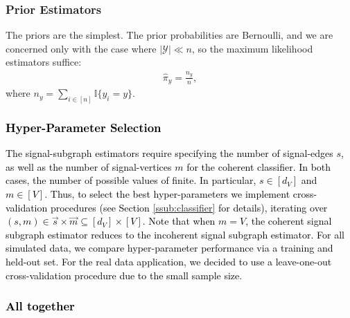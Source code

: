 \documentclass[10pt,journal,cspaper,compsoc]{IEEEtran}
\providecommand{\tk}[1]{\textcolor{black}{#1}}
\newcommand{\II}{\mathbb{I}}           %
\providecommand{\mc}[1]{\mathcal{#1}}
\providecommand{\mv}[1]{\vec{#1}}
\providecommand{\wh}[1]{\widehat{#1}}
\begin{document}



\subsubsection{Prior Estimators} %
\label{sub:prior_estimators}

The priors are the simplest.  The prior probabilities are Bernoulli, and we are concerned only with the case where $|\mc{Y}| \ll n$, so the maximum likelihood estimators suffice:
\begin{align} \label{eq:prior}
\wh{\pi}_y = \frac{n_y}{n},
\end{align}
where $n_y=\sum_{i \in [n]} \II\{y_i = y\}$.




\tk{\subsubsection{Hyper-Parameter Selection}}

\tk{The signal-subgraph estimators require specifying the number of signal-edges $s$, as well as the number of signal-vertices $m$ for the coherent classifier.  In both cases, the number of possible values of finite.  In particular, $s \in [d_V]$ and $m \in [V]$.  Thus, 
to select the best hyper-parameters
we implement cross-validation procedures (see Section \ref{ssub:classifier} for details), iterating over $(s,m) \in \mv{s} \times \mv{m} \subseteq [d_V] \times [V]$. Note that when $m=V$, the coherent signal subgraph estimator reduces to the incoherent signal subgraph estimator. 
For all simulated data, we compare hyper-parameter performance via a training and held-out set.  For the real data application, we decided to use a leave-one-out cross-validation procedure due to the small sample size.}    



\tk{\subsubsection{All together}} %
\label{ssub:all_together}
\end{document}
